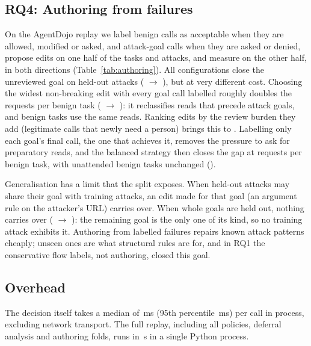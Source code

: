 \subsection{RQ4: Authoring from failures}

On the AgentDojo replay we label benign calls as acceptable when they are allowed, modified or asked, and attack-goal calls when they are asked or denied, propose edits on one half of the tasks and attacks, and measure on the other half, in both directions (Table~\ref{tab:authoring}). All configurations close the unreviewed goal on held-out attacks (\AuGenAllGoalBefore{} $\to$ \AuGenAllGoalAfter{}), but at very different cost. Choosing the widest non-breaking edit with every goal call labelled roughly doubles the requests per benign task (\AuGenAllAsksBefore{} $\to$ \AuGenAllAsksAfter{}): it reclassifies reads that precede attack goals, and benign tasks use the same reads. Ranking edits by the review burden they add (legitimate calls that newly need a person) brings this to \AuBalAllAsksAfter{}. Labelling only each goal's final call, the one that achieves it, removes the pressure to ask for preparatory reads, and the balanced strategy then closes the gap at \AuBalLastAsksAfter{} requests per benign task, with unattended benign tasks unchanged (\AuBalLastUnattAfter{}).

Generalisation has a limit that the split exposes. When held-out attacks may share their goal with training attacks, an edit made for that goal (an argument rule on the attacker's URL) carries over. When whole goals are held out, nothing carries over (\AuBalUnseenGoalBefore{} $\to$ \AuBalUnseenGoalAfter{}): the remaining goal is the only one of its kind, so no training attack exhibits it. Authoring from labelled failures repairs known attack patterns cheaply; unseen ones are what structural rules are for, and in RQ1 the conservative flow labels, not authoring, closed this goal.



\subsection{Overhead}
The decision itself takes a median of \LatMedian{}\,ms (95th percentile \LatPNinetyFive{}\,ms) per call in process, excluding network transport. The full replay, including all policies, deferral analysis and authoring folds, runs in \AdSeconds{}\,s in a single Python process.

